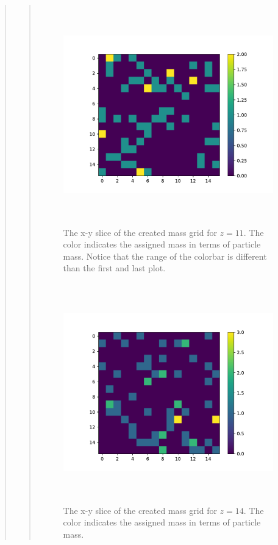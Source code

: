 \begin{quote}
\begin{quote}
\begin{figure}[!ht]
\centering
\includegraphics[width=14cm, height=9.5cm]{./Plots/5a_slice_11.pdf}
\caption{The x-y slice of the created mass grid for $z = 11$. The color indicates the assigned mass in terms of particle mass. Notice that the range of the colorbar is different than the first and last plot. }
\end{figure}

\begin{figure}[!ht]
\centering
\includegraphics[width=14cm, height=9.5cm]{./Plots/5a_slice_14.pdf}
\caption{The x-y slice of the created mass grid for $z = 14$. The color indicates the assigned mass in terms of particle mass. }
\end{figure}
\end{quote}
\newpage
\end{quote}











